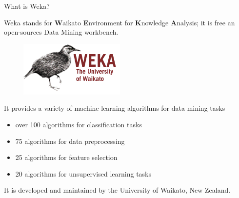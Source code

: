 \documentclass{beamer}
\begin{document}
\begin{frame}{What is Weka?}

\begin{minipage}[t]{.5\textwidth}
Weka stands for \textbf{\textsc{W}}aikato \textbf{\textsc{E}}nvironment for 
\textbf{\textsc{K}}nowledge
\textbf{\textsc{A}}nalysis; it is free an open-sources Data Mining workbench.
\end{minipage}
%
%
\hspace{0.3cm}
\begin{minipage}[t]{.3\textwidth}
\vspace{-0.5cm}
\begin{figure}[!t]
\includegraphics[scale=0.8]{img/logoWeka.png}
\end{figure}
\end{minipage}

\vskip 10pt
It provides a variety of machine learning algorithms for data mining tasks
\begin{itemize}
\item over 100 algorithms for classification tasks
\item 75 algorithms for data preprocessing
\item 25 algorithms for feature selection
\item 20 algorithms for unsupervised learning tasks
\end{itemize}

\vskip 10pt
It is developed and maintained by the University of Waikato, New Zealand.
\end{frame}
\end{document}
